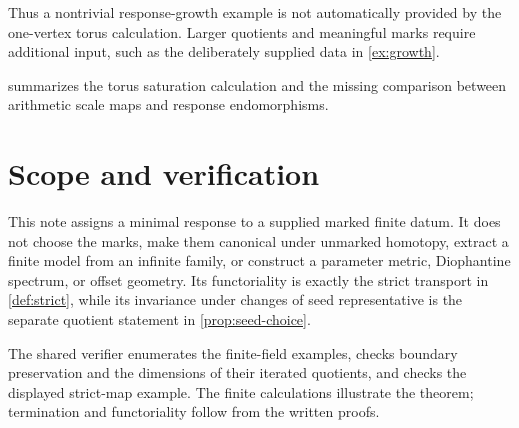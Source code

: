 \documentclass[11pt,a4paper]{article}
\begin{document}
Thus a nontrivial response-growth example is not automatically provided
by the one-vertex torus calculation.  Larger quotients and meaningful
marks require additional input, such as the deliberately supplied data
in \cref{ex:growth}.

 summarizes the torus saturation calculation
and the missing comparison between arithmetic scale maps and response
endomorphisms.


\section{Scope and verification}

This note assigns a minimal response to a supplied marked finite datum.
It does not choose the marks, make them canonical under unmarked homotopy,
extract a finite model from an infinite family, or construct a parameter
metric, Diophantine spectrum, or offset geometry.  Its functoriality is
exactly the strict transport in \cref{def:strict}, while its invariance
under changes of seed representative is the separate quotient statement
in \cref{prop:seed-choice}.

The shared verifier 
enumerates the finite-field examples, checks boundary preservation and
the dimensions of their iterated quotients, and checks the displayed
strict-map example.  The finite calculations illustrate the theorem;
termination and functoriality follow from the written proofs.



\end{document}
